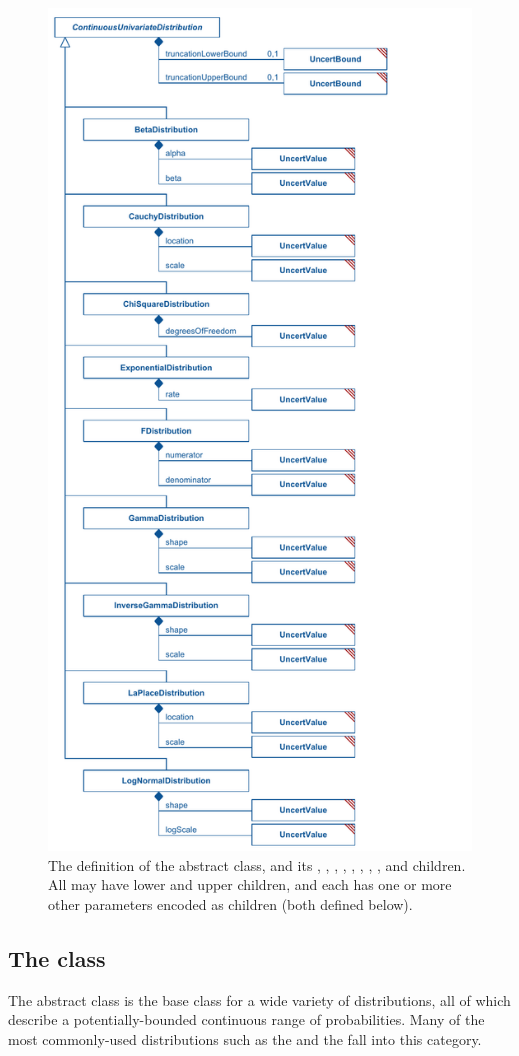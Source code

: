 \begin{figure}[htb]
\includegraphics[width=0.55\linewidth]{figs/continuousUnivariateDistribution_first.pdf}
\caption{The definition of the \ContinuousUnivariateDistribution abstract class, and its \BetaDistribution, \CauchyDistribution, \ChiSquareDistribution, \ExponentialDistribution, \FDistribution, \GammaDistribution, \InverseGammaDistribution, \LaPlaceDistribution, and \LogNormalDistribution children.  All may have lower and upper \UncertBound children, and each has one or more other parameters encoded as \UncertValue children (both defined below).}
\label{fig:continuousUnivariateDistribution_first}
\end{figure}


\subsection{The  class}
\label{ContinuousUnivariateDistribution-class}
\label{continuousunivariatedistribution-class}
The abstract \ContinuousUnivariateDistribution class is the base class for a wide variety of distributions, all of which describe a potentially-bounded continuous range of probabilities.  Many of the most commonly-used distributions such as the \NormalDistribution and the \UniformDistribution fall into this category.

